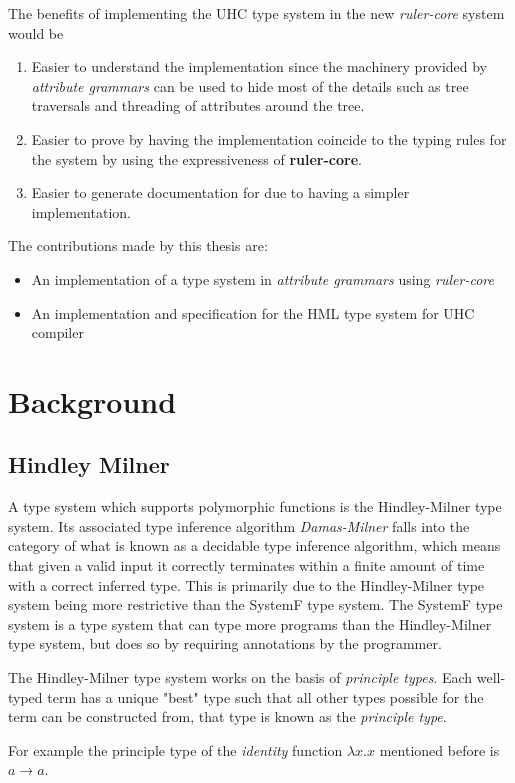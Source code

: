 \documentclass[twoside, titlepage, openright, a4paper]{book}
\newcommand{\ags}{\emph{attribute grammars }}
\newcommand{\rcore}{\emph{ruler-core }}
\begin{document}
The benefits of implementing the UHC type system in the new \rcore system would be

\begin{enumerate}
\item Easier to understand the implementation since the machinery provided by \ags can be used to hide most of the details such as tree traversals and threading of attributes around the tree.
\item Easier to prove by having the implementation coincide to the typing rules for the system by using the expressiveness of \textbf{ruler-core}.
\item Easier to generate documentation for due to having a simpler implementation.
\end{enumerate}

The contributions made by this thesis are:
\begin{itemize}
\item An implementation of a type system in \ags using \rcore
\item An implementation and specification for the HML type system for UHC compiler
\end{itemize}

\chapter{Background}
\section{Hindley Milner}
A type system which supports polymorphic functions is the Hindley-Milner\cite{HM} type system. Its associated type inference algorithm \emph{Damas-Milner} falls into the category of what is known as a decidable type inference algorithm, which means that given a valid input it correctly terminates within a finite amount of time with a correct inferred type. This is primarily due to the Hindley-Milner type system being more restrictive than the SystemF type system. The SystemF type system is a type system that can type more programs than the Hindley-Milner type system, but does so by requiring annotations by the programmer.

The Hindley-Milner type system works on the basis of \textit{principle types}. Each well-typed term has a unique "best" type such that all other types possible for the term can be constructed from, that type is known as the \textit{principle type}. 

For example the principle type of the \textit{identity} function $\lambda x.x$ mentioned before is $a \rightarrow a$.
\end{document}
